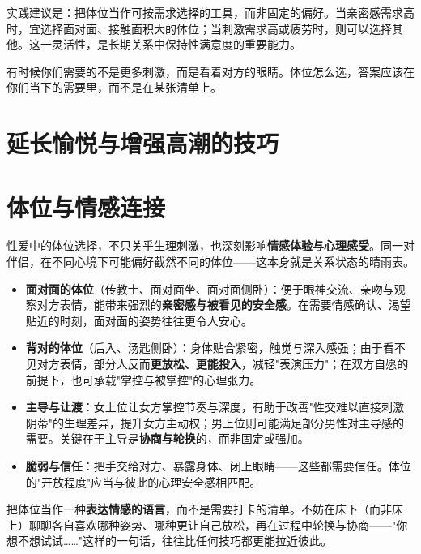 \documentclass[12pt,UTF8]{ctexbook}
\begin{document}
实践建议是：把体位当作可按需求选择的工具，而非固定的偏好。当亲密感需求高时，宜选择面对面、接触面积大的体位；当刺激需求高或疲劳时，则可以选择其他。这一灵活性，是长期关系中保持性满意度的重要能力。

\begin{tcolorbox}[colback=pink!5!white,colframe=red!50!black,title=贴心小叮咛]
有时候你们需要的不是更多刺激，而是看着对方的眼睛。体位怎么选，答案应该在你们当下的需要里，而不是在某张清单上。
\end{tcolorbox}

\section{延长愉悦与增强高潮的技巧}


\section{体位与情感连接}

性爱中的体位选择，不只关乎生理刺激，也深刻影响\textbf{情感体验与心理感受}。同一对伴侣，在不同心境下可能偏好截然不同的体位——这本身就是关系状态的晴雨表。

\begin{itemize}
	\item \textbf{面对面的体位}（传教士、面对面坐、面对面侧卧）：便于眼神交流、亲吻与观察对方表情，能带来强烈的\textbf{亲密感与被看见的安全感}。在需要情感确认、渴望贴近的时刻，面对面的姿势往往更令人安心。
	\item \textbf{背对的体位}（后入、汤匙侧卧）：身体贴合紧密，触觉与深入感强；由于看不见对方表情，部分人反而\textbf{更放松、更能投入}，减轻"表演压力"；在双方自愿的前提下，也可承载"掌控与被掌控"的心理张力。
	\item \textbf{主导与让渡}：女上位让女方掌控节奏与深度，有助于改善"性交难以直接刺激阴蒂"的生理差异，提升女方主动权；男上位则可能满足部分男性对主导感的需要。关键在于主导是\textbf{协商与轮换}的，而非固定或强加。
	\item \textbf{脆弱与信任}：把手交给对方、暴露身体、闭上眼睛——这些都需要信任。体位的"开放程度"应当与彼此的心理安全感相匹配。
\end{itemize}

\begin{tcolorbox}[colback=pink!5!white,colframe=red!50!black,title=贴心小叮咛]
	把体位当作一种\textbf{表达情感的语言}，而不是需要打卡的清单。不妨在床下（而非床上）聊聊各自喜欢哪种姿势、哪种更让自己放松，再在过程中轮换与协商——"你想不想试试……"这样的一句话，往往比任何技巧都更能拉近彼此。
\end{tcolorbox}
\end{document}
